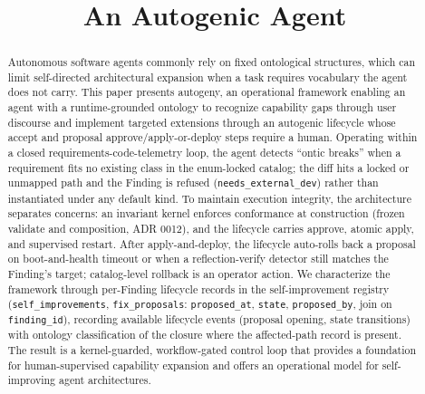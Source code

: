 \documentclass[conference,10pt]{IEEEtran}
\title{An Autogenic Agent}
\author{\IEEEauthorblockN{J. Brant Arseneau\IEEEauthorrefmark{1}}
\IEEEauthorblockA{Mach33 Group, New York\\
Toronto, Canada / New York, USA\\
brant.arseneau@33fg.com}}
\begin{document}
\maketitle

\begin{abstract}
Autonomous software agents commonly rely on fixed ontological structures, which can limit self-directed architectural expansion when a task requires vocabulary the agent does not carry. This paper presents autogeny, an operational framework enabling an agent with a runtime-grounded ontology to recognize capability gaps through user discourse and implement targeted extensions through an autogenic lifecycle whose accept and proposal approve/apply-or-deploy steps require a human. Operating within a closed requirements-code-telemetry loop, the agent detects ``ontic breaks'' when a requirement fits no existing class in the enum-locked catalog; the diff hits a locked or unmapped path and the Finding is refused (\texttt{needs\_external\_dev}) rather than instantiated under any default kind. To maintain execution integrity, the architecture separates concerns: an invariant kernel enforces conformance at construction (frozen validate and composition, ADR 0012), and the lifecycle carries approve, atomic apply, and supervised restart. After apply-and-deploy, the lifecycle auto-rolls back a proposal on boot-and-health timeout or when a reflection-verify detector still matches the Finding's target; catalog-level rollback is an operator action. We characterize the framework through per-Finding lifecycle records in the self-improvement registry (\texttt{self\_improvements}, \texttt{fix\_proposals}: \texttt{proposed\_at}, \texttt{state}, \texttt{proposed\_by}, join on \texttt{finding\_id}), recording available lifecycle events (proposal opening, state
transitions) with ontology classification of the closure where the
affected-path record is present. The result is a kernel-guarded, workflow-gated control loop that provides a foundation for human-supervised capability expansion and offers an operational model for self-improving agent architectures.
\end{abstract}
\end{document}
